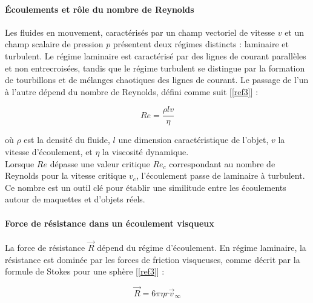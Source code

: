 \documentclass[a4paper, 12pt,oneside]{article}
\begin{document}
\paragraph{Écoulements et rôle du nombre de Reynolds}

Les fluides en mouvement, caractérisés par un champ vectoriel de vitesse $v$ et un champ scalaire de pression $p$ présentent deux régimes distincts : laminaire et turbulent. Le régime laminaire est caractérisé par des lignes de courant parallèles et non entrecroisées, tandis que le régime turbulent se distingue par la formation de tourbillons et de mélanges chaotiques des lignes de courant. Le passage de l’un à l’autre dépend du nombre de Reynolds, défini comme suit [\ref{ref3}] :  

\vspace{-0.3cm}

\begin{equation}
Re = \frac{\rho l v}{\eta}
\label{eq1}
\end{equation}  

\vspace{-0.15cm}

\noindent où $\rho$ est la densité du fluide, $l$ une dimension caractéristique de l’objet, $v$ la vitesse d’écoulement, et $\eta$ la viscosité dynamique. 
\\
Lorsque $Re$ dépasse une valeur critique $Re_c$ correspondant au nombre de Reynolds pour la vitesse critique $v_c$, l’écoulement passe de laminaire à turbulent. Ce nombre est un outil clé pour établir une similitude entre les écoulements autour de maquettes et d’objets réels.

\vspace{-0.25cm}

\paragraph{Force de résistance dans un écoulement visqueux}

La force de résistance $\vec{R}$ dépend du régime d’écoulement. En régime laminaire, la résistance est dominée par les forces de friction visqueuses, comme décrit par la formule de Stokes pour une sphère [\ref{ref3}] :

\vspace{-0.25cm}

\begin{equation}
\vec{R} = 6 \pi \eta r \vec{v}_\infty
\label{eq2}
\end{equation}
\end{document}
